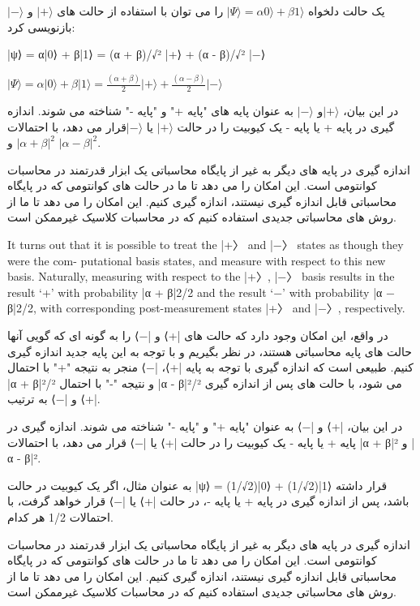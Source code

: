 \documentclass{book}
\begin{document}
 
 یک حالت دلخواه $\vert\Psi\rangle = \alpha0\rangle + \beta1\rangle$ را می توان با استفاده از حالت های $\vert + \rangle$ و $\vert - \rangle$ بازنویسی کرد:

|ψ⟩ = α|0⟩ + β|1⟩ = (α + β)/√² |+⟩ + (α - β)/√² |−⟩
\begin{center}
	$\vert\Psi\rangle = \alpha \vert0\rangle + \beta\vert1\rangle = \frac{(\alpha + \beta)}{2}\vert+\rangle + \frac{(\alpha - \beta)}{2}\vert-\rangle$
\end{center}


در این بیان، $\vert+\rangle$و $\vert-\rangle$ به عنوان پایه های "پایه +" و "پایه -" شناخته می شوند. اندازه گیری در پایه + یا پایه - یک کیوبیت را در حالت $\vert+\rangle$ یا $\vert-\rangle$قرار می دهد، با احتمالات $\vert\alpha+\beta\vert^2$ و $\vert\alpha-\beta\vert^2$.

 

اندازه گیری در پایه های دیگر به غیر از پایگاه محاسباتی یک ابزار قدرتمند در محاسبات کوانتومی است. این امکان را می دهد تا ما در حالت های کوانتومی که در پایگاه محاسباتی قابل اندازه گیری نیستند، اندازه گیری کنیم. این امکان را می دهد تا ما از روش های محاسباتی جدیدی استفاده کنیم که در محاسبات کلاسیک غیرممکن است.



It turns out that it is possible to treat the |+〉 and |−〉 states as though they were the com-
putational basis states, and measure with respect to this new basis. Naturally, measuring
with respect to the |+〉, |−〉 basis results in the result ‘+’ with probability |α + β|2/2 and
the result ‘−’ with probability |α − β|2/2, with corresponding post-measurement states
|+〉 and |−〉, respectively.


در واقع، این امکان وجود دارد که حالت های |+⟩ و |−⟩ را به گونه ای که گویی آنها حالت های پایه محاسباتی هستند، در نظر بگیریم و با توجه به این پایه جدید اندازه گیری کنیم. طبیعی است که اندازه گیری با توجه به پایه |+⟩، |−⟩ منجر به نتیجه "+" با احتمال |α + β|²/² و نتیجه "-" با احتمال |α - β|²/² می شود، با حالت های پس از اندازه گیری |+⟩ و |−⟩ به ترتیب.

در این بیان، |+⟩ و |−⟩ به عنوان "پایه +" و "پایه -" شناخته می شوند. اندازه گیری در پایه + یا پایه - یک کیوبیت را در حالت |+⟩ یا |−⟩ قرار می دهد، با احتمالات |α + β|² و |α - β|².

به عنوان مثال، اگر یک کیوبیت در حالت |ψ⟩ = (1/√2)|0⟩ + (1/√2)|1⟩ قرار داشته باشد، پس از اندازه گیری در پایه + یا پایه -، در حالت |+⟩ یا |−⟩ قرار خواهد گرفت، با احتمالات 1/2 هر کدام.

اندازه گیری در پایه های دیگر به غیر از پایگاه محاسباتی یک ابزار قدرتمند در محاسبات کوانتومی است. این امکان را می دهد تا ما در حالت های کوانتومی که در پایگاه محاسباتی قابل اندازه گیری نیستند، اندازه گیری کنیم. این امکان را می دهد تا ما از روش های محاسباتی جدیدی استفاده کنیم که در محاسبات کلاسیک غیرممکن است.
\end{document}

